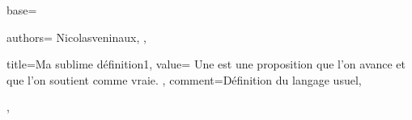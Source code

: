 {
  base={
    authors={
      Nicolasveninaux,
    },
    
    title=Ma sublime définition1,
    value={
      Une  est une proposition que l'on avance et que l'on soutient comme vraie.
    },
    comment={Définition du langage usuel},
    
  },
}
